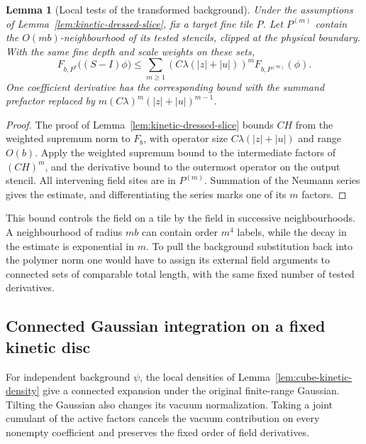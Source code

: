 \documentclass[11pt]{article}
\newtheorem{lemma}[theorem]{Lemma}
\theoremstyle{definition}
\begin{document}
\begin{lemma}[Local tests of the transformed background]
\label{lem:cube-kinetic-background}
Under the assumptions of Lemma~\ref{lem:kinetic-dressed-slice},
fix a target fine tile \(P\). Let \(P^{(m)}\) contain the
\(O(mb)\)-neighbourhood of its tested stencils, clipped at the
physical boundary. With the same fine depth and scale weights
on these sets,
\begin{equation}
 F_{b,P^*}\big((S-I)\phi\big)
 \le \sum_{m\ge1}(C\lambda (|z|+|u|))^m
                      F_{b,P^{(m)}}(\phi).
\end{equation}
One coefficient derivative has the corresponding bound with
the summand prefactor replaced by
\(m(C\lambda)^m(|z|+|u|)^{m-1}\).
\end{lemma}

\begin{proof}
The proof of Lemma~\ref{lem:kinetic-dressed-slice} bounds
\(CH\) from the weighted supremum norm to \(F_b\), with
operator size \(C\lambda (|z|+|u|)\) and range \(O(b)\).
Apply the weighted supremum bound to the intermediate factors
of \((CH)^m\), and the derivative bound to the outermost operator
on the output stencil. All intervening field sites are in
\(P^{(m)}\). Summation of the Neumann series gives the
estimate, and differentiating the series marks one of its
\(m\) factors.
\end{proof}

This bound controls the field on a tile by the field in successive
neighbourhoods. A neighbourhood of radius \(mb\) can contain order
\(m^4\) labels, while the decay in the estimate is exponential in
\(m\). To pull the background substitution back into the polymer
norm one would have to assign its external field arguments to
connected sets of comparable total length, with the same fixed
number of tested derivatives.

\subsection{Connected Gaussian integration on a fixed kinetic disc}
\label{sec:kinetic-vacuum-graphs}

For independent background \(\psi\), the local densities of
Lemma~\ref{lem:cube-kinetic-density} give a connected expansion
under the original finite-range Gaussian. Tilting the Gaussian
also changes its vacuum normalization. Taking a joint cumulant
of the active factors cancels the vacuum contribution on every
nonempty coefficient and preserves the fixed order of field
derivatives.
\end{document}
